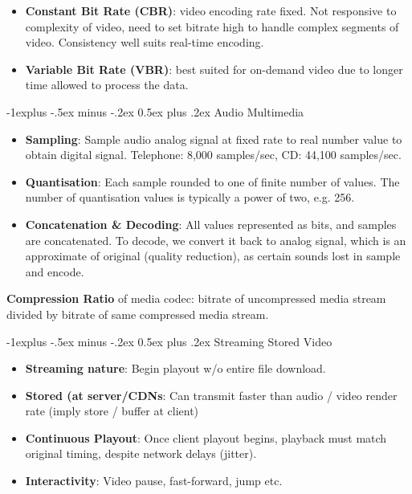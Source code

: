 \documentclass[12pt, landscape]{article}
\makeatletter
\renewcommand{\subsection}{\@startsection{subsection}{2}{0.1mm}%
                                {-1explus -.5ex minus -.2ex}%
                                {0.5ex plus .2ex}%
                                {\normalfont\normalsize\bfseries}}
\makeatother
\begin{document}
\begin{multicols*}{3}
\begin{itemize}
\item \textbf{Constant Bit Rate (CBR)}: video encoding rate fixed. Not responsive to complexity of video, need to set bitrate high to handle complex segments of video. Consistency well suits real-time encoding.
\item \textbf{Variable Bit Rate (VBR)}: best suited for on-demand video due to longer time allowed to process the data.
\end{itemize}

\subsection{Audio Multimedia}
\begin{itemize}
\item \textbf{Sampling}: Sample audio analog signal at fixed rate to real number value to obtain digital signal. Telephone: 8,000 samples/sec, CD: 44,100 samples/sec.
\item \textbf{Quantisation}: Each sample rounded to one of finite number of values. The number of quantisation
values is typically a power of two, e.g. 256.
\item \textbf{Concatenation \& Decoding}: All values represented as bits, and samples are concatenated. To decode, we convert it back to analog signal, which is an approximate of original (quality reduction), as certain sounds lost in sample and encode.
\end{itemize}

\textbf{Compression Ratio} of media codec: bitrate of uncompressed media stream divided by bitrate of same compressed media stream.

\subsection{Streaming Stored Video}
\begin{itemize}
\item \textbf{Streaming nature}: Begin playout w/o entire file download.
\item \textbf{Stored (at server/CDNs}: Can transmit faster than audio / video render rate (imply store / buffer at client)
\item \textbf{Continuous Playout}: Once client playout begins, playback must match original 
timing, despite network delays (jitter).
\item \textbf{Interactivity}: Video pause, fast-forward, jump etc.
\end{itemize}


\end{multicols*}
\end{document}
